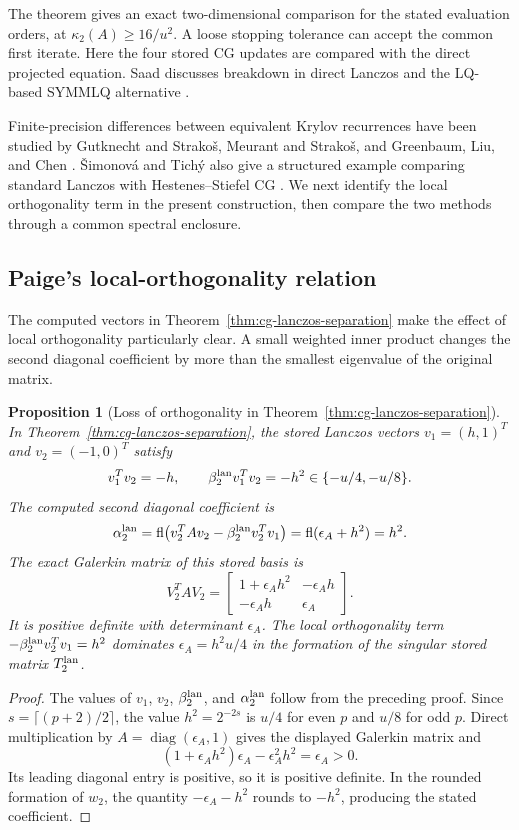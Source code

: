 \documentclass[11pt]{article}
\newtheorem{proposition}{Proposition}
\theoremstyle{definition}
\newcommand{\fl}{\operatorname{fl}}
\newcommand{\diag}{\operatorname{diag}}
\begin{document}
The theorem gives an exact two-dimensional comparison for the stated
evaluation orders, at $\kappa_2(A)\ge16/u^2$.  A loose stopping tolerance
can accept the common first iterate.  Here the four
stored CG updates are compared with the direct projected equation.
Saad discusses breakdown in direct Lanczos and the LQ-based SYMMLQ
alternative \cite[pp.~197--198]{Saad2003}.

Finite-precision differences between equivalent Krylov recurrences have
been studied by Gutknecht and Strako\v{s}, Meurant and Strako\v{s}, and
Greenbaum, Liu, and Chen
\cite{GutknechtStrakos2000,MeurantStrakos2006,GreenbaumLiuChen2021}.
\v{S}imonov\'a and Tich\'y also give a structured example comparing
standard Lanczos with Hestenes--Stiefel CG \cite{SimonovaTichy2022}.
We next identify the local orthogonality term in the present construction,
then compare the two methods through a common spectral enclosure.
\subsection{Paige's local-orthogonality relation}
\label{sec:mechanism-216}

The computed vectors in Theorem~\ref{thm:cg-lanczos-separation} make
the effect of local orthogonality particularly clear.  A small weighted
inner product changes the second diagonal coefficient by more than the
smallest eigenvalue of the original matrix.

\begin{proposition}[Loss of orthogonality in Theorem~\ref{thm:cg-lanczos-separation}]
\label{prop:paige-step-one}
In Theorem~\ref{thm:cg-lanczos-separation}, the stored Lanczos vectors
$v_1=(h,1)^T$ and $v_2=(-1,0)^T$ satisfy
\[
 v_1^Tv_2=-h,\qquad
 \beta_2^{\rm lan}v_1^Tv_2=-h^2\in\{-u/4,-u/8\}.
\]
The computed second diagonal coefficient is
\[
 \alpha_2^{\rm lan}
 =\fl\bigl(v_2^TAv_2-\beta_2^{\rm lan}v_2^Tv_1\bigr)
 =\fl(\epsilon_A+h^2)=h^2.
\]
The exact Galerkin matrix of this stored basis is
\[
 V_2^TAV_2=
 \begin{bmatrix}1+\epsilon_Ah^2&-\epsilon_Ah\\
                 -\epsilon_Ah&\epsilon_A\end{bmatrix}.
\]
It is positive definite with determinant $\epsilon_A$.  The local
orthogonality term $-\beta_2^{\rm lan}v_2^Tv_1=h^2$ dominates
$\epsilon_A=h^2u/4$ in the formation of the singular stored matrix
$T_2^{\rm lan}$.
\end{proposition}

\begin{proof}
The values of $v_1$, $v_2$, $\beta_2^{\rm lan}$, and
$\alpha_2^{\rm lan}$ follow from the preceding proof.  Since
$s=\lceil(p+2)/2\rceil$, the value $h^2=2^{-2s}$ is $u/4$ for even $p$
and $u/8$ for odd $p$.  Direct multiplication by
$A=\diag(\epsilon_A,1)$ gives the displayed Galerkin matrix and
\[
 (1+\epsilon_Ah^2)\epsilon_A-\epsilon_A^2h^2=\epsilon_A>0.
\]
Its leading diagonal entry is positive, so it is positive definite.
In the rounded formation of $w_2$, the quantity
$-\epsilon_A-h^2$ rounds to $-h^2$, producing the stated coefficient.
\end{proof}
\end{document}
